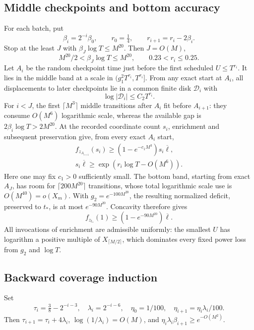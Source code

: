 \documentclass[11pt]{article}
\numberwithin{equation}{section}
\theoremstyle{definition}\newtheorem{definition}[theorem]{Definition}
\theoremstyle{remark}\newtheorem{remark}[theorem]{Remark}
\newcommand{\abs}[1]{\lvert #1\rvert}
\newcommand{\Lb}{\overline{\ell}}
\begin{document}
\subsection{Middle checkpoints and bottom accuracy}

For each batch, put
\[
 \beta_i=2^{-i}\beta_0,\qquad r_0=\tfrac14,\qquad
 r_{i+1}=r_i-2\beta_i.
\]
Stop at the least $J$ with $\beta_J\log T\le M^{20}$. Then $J=O(M)$,
\[
 M^{20}/2<\beta_J\log T\le M^{20},\qquad 0.23<r_i\le0.25.
\]
Let $A_i$ be the random checkpoint time just before the first scheduled $U\le T^{r_i}$. It lies in the middle band at a scale in $(g_1^2T^{r_i},T^{r_i}]$. From any exact start at $A_i$, all displacements to later checkpoints lie in a common finite disk $\mathcal D_i$ with
\begin{equation}\label{eq:disk}
 \log\abs{\mathcal D_i}\le C_2T^{r_i}.
\end{equation}
For $i<J$, the first $\lceil M^3\rceil$ middle transitions after $A_i$ fit before $A_{i+1}$: they consume $O(M^6)$ logarithmic scale, whereas the available gap is
$2\beta_i\log T>2M^{20}$. At the recorded coordinate count $s_i$, enrichment and subsequent preservation give, from every exact $A_i$ start,
\begin{gather}
 f_{z_{A_{i+1}}}(s_i)\ge(1-e^{-c_1M^3})s_i\Lb,\label{eq:middleentropy}\\
 s_i\Lb\ge\exp(r_i\log T-O(M^6)).\label{eq:middlesize}
\end{gather}
Here one may fix $c_1>0$ sufficiently small. The bottom band, starting from exact $A_J$, has room for $\lceil200M^{20}\rceil$ transitions, whose total logarithmic scale use is $O(M^{40})=o(X_m)$. With $g_2=e^{-100M^{20}}$, the resulting normalized deficit, preserved to $t_*$, is at most $e^{-90M^{20}}$. Concavity therefore gives
\begin{equation}\label{eq:bottom}
 f_{z_{t_*}}(1)\ge(1-e^{-90M^{20}})\Lb.
\end{equation}
All invocations of enrichment are admissible uniformly: the smallest $U$ has logarithm a positive multiple of $X_{\lceil M/2\rceil}$, which dominates every fixed power loss from $g_2$ and $\log T$.

\subsection{Backward coverage induction}

Set
\[
 \tau_i=\tfrac38-2^{-i-3},\quad \lambda_i=2^{-i-6},\quad
 \eta_0=1/100,\quad \eta_{i+1}=\eta_i\lambda_i/100.
\]
Then $\tau_{i+1}=\tau_i+4\lambda_i$, $\log(1/\lambda_i)=O(M)$, and
$\eta_i\lambda_i\beta_{i+1}\ge e^{-O(M^2)}$.
\end{document}
